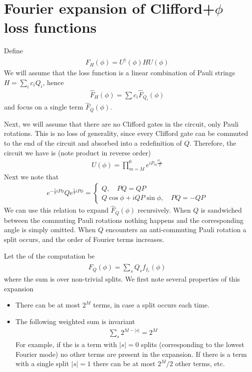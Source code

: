 \documentclass[12 pt]{article}
\begin{document}
\section{Fourier expansion of Clifford+$\phi$ loss functions}
Define 
\begin{align}
	\widehat{F}_H(\phi)=U^\dagger(\phi)HU(\phi)
\end{align}
We will assume that the loss function is a linear combination of Pauli strings $H=\sum_i c_i Q_i$, hence
\begin{align}
	\widehat{F}_{H}(\phi)=\sum c_i \widehat{F}_{Q_i}(\phi)
\end{align}
and focus on a single term $\widehat{F}_Q(\phi)$.

Next, we will assume that there are no Clifford gates in the circuit, only Pauli rotations. This is no loss of generality, since every Clifford gate can be commuted to the end of the circuit and absorbed into a redefinition of $Q$. Therefore, the circuit we have is (note product in reverse order)
\begin{align}
	U(\phi)=\prod_{m=M}^0 e^{i P_m \frac{\phi_m}{2}}
\end{align}
Next we note that
\begin{align}
	e^{-\frac12iP\phi}Qe^{\frac12iP\phi}=\begin{cases}
	Q,\quad PQ=QP\\ Q\cos\phi + iQP\sin\phi,\quad PQ=-QP
	\end{cases}
\end{align}
We can use this relation to expand $\widehat{F}_Q(\phi)$ recursively. When $Q$ is sandwiched between the commuting Pauli rotations nothing happens and the corresponding angle is simply omitted. When $Q$ encounters an anti-commuting Pauli rotation a split occurs, and the order of Fourier terms increases.

Let the of the computation be
\begin{align}
	\widehat{F}_Q(\phi)=\sum_s Q_s f_{I_s}(\phi)
\end{align}
where the sum is over non-trivial splits. We first note several properties of this expansion
\begin{itemize}
	\item There can be at most $2^M$ terms, in case a split occurs each time.
	\item The following weighted sum is invariant
	\begin{align}
		\sum_s 2^{M-|s|}=2^M
	\end{align}
	For example, if the is a term with $|s|=0$ splits (corresponding to the lowest Fourier mode) no other terms are present in the expansion. If there is a term with a single split $|s|=1$ there can be at most $2^{M}/2$ other terms, etc.
\end{itemize}
\end{document}
